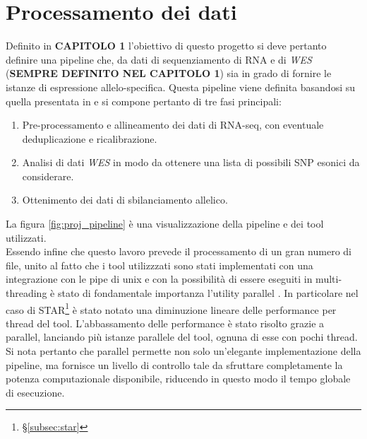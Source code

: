 \graphicspath{{chapters/03/media/}}
\chapter{Processamento dei dati}
\label{cha:processamento}
Definito in \textbf{CAPITOLO 1} l'obiettivo di questo progetto si deve pertanto definire una pipeline che, da dati di sequenziamento di RNA e di \emph{WES} (\textbf{SEMPRE DEFINITO NEL CAPITOLO 1}) sia in grado di fornire le istanze di espressione allelo-specifica.
Questa pipeline viene definita basandosi su quella presentata in \cite{ase_pipeline} e si compone pertanto di tre fasi principali:
\begin{enumerate}
	\item Pre-processamento e allineamento dei dati di RNA-seq, con eventuale deduplicazione e ricalibrazione.
	\item Analisi di dati \emph{WES} in modo da ottenere una lista di possibili SNP esonici da considerare.
	\item Ottenimento dei dati di sbilanciamento allelico.
\end{enumerate}
La figura \ref{fig:proj_pipeline} \`e una visualizzazione della pipeline e dei tool utilizzati.\\
Essendo infine che questo lavoro prevede il processamento di un gran numero di file, unito al fatto che i tool utilizzzati sono stati implementati con una integrazione con le pipe di unix e con la possibilit\`a di essere eseguiti in multi-threading \`e stato di fondamentale importanza l'utility parallel \cite{parallel}.
In particolare nel caso di STAR\footnote{\S\ref{subsec:star}} \`e stato notato una diminuzione lineare delle performance per thread del tool.
L'abbassamento delle performance \`e stato risolto grazie a parallel, lanciando pi\`u istanze parallele del tool, ognuna di esse con pochi thread.
Si nota pertanto che parallel permette non solo un'elegante implementazione della pipeline, ma fornisce un livello di controllo tale da sfruttare completamente la potenza computazionale disponibile, riducendo in questo modo il tempo globale di esecuzione.


